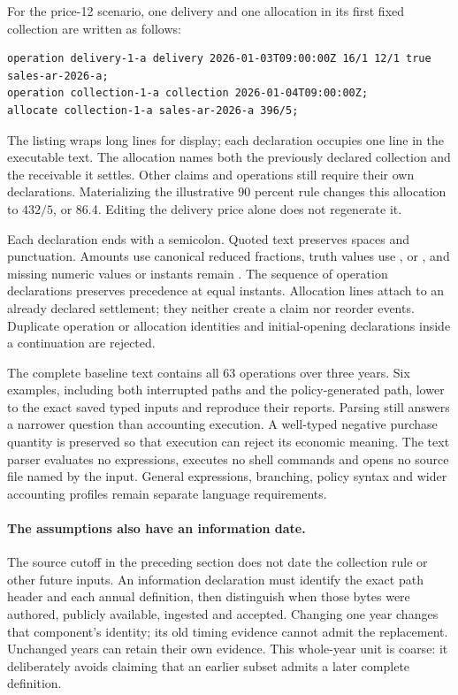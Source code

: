 For the price-12 scenario, one delivery and one allocation in its first fixed
collection are written as follows:
\begin{lstlisting}
operation delivery-1-a delivery 2026-01-03T09:00:00Z 16/1 12/1 true sales-ar-2026-a;
operation collection-1-a collection 2026-01-04T09:00:00Z;
allocate collection-1-a sales-ar-2026-a 396/5;
\end{lstlisting}
The listing wraps long lines for display; each declaration occupies one line
in the executable text. The allocation names both the
previously declared collection and the receivable it settles. Other claims and
operations still require their own declarations. Materializing the illustrative
90 percent rule changes this allocation to \(432/5\), or 86.4. Editing the
delivery price alone does not regenerate it.

Each declaration ends with a semicolon. Quoted text preserves spaces and
punctuation. Amounts use canonical reduced fractions, truth values use
,  or , and missing numeric values or
instants remain . The sequence of operation declarations preserves
precedence at equal instants. Allocation lines attach to an already declared
settlement; they neither create a claim nor reorder events. Duplicate operation
or allocation identities and initial-opening declarations inside a continuation
are rejected.

The complete baseline text contains all 63 operations over three years.
Six examples, including both interrupted paths and the policy-generated path,
lower to the exact saved typed inputs and reproduce their reports. Parsing
still answers a narrower question than accounting execution. A well-typed
negative purchase quantity is preserved so that execution can reject its
economic meaning. The text parser evaluates no expressions, executes no shell
commands and opens no source file named by the input. General expressions,
branching, policy syntax and wider accounting profiles remain separate language
requirements.

\paragraph{The assumptions also have an information date.}
The source cutoff in the preceding section does not date the collection rule
or other future inputs. An information declaration must identify the exact
path header and each annual definition, then distinguish when those bytes were
authored, publicly available, ingested and accepted. Changing one year changes
that component's identity; its old timing evidence cannot admit the replacement.
Unchanged years can retain their own evidence. This whole-year unit is coarse:
it deliberately avoids claiming that an earlier subset admits a later complete
definition.

